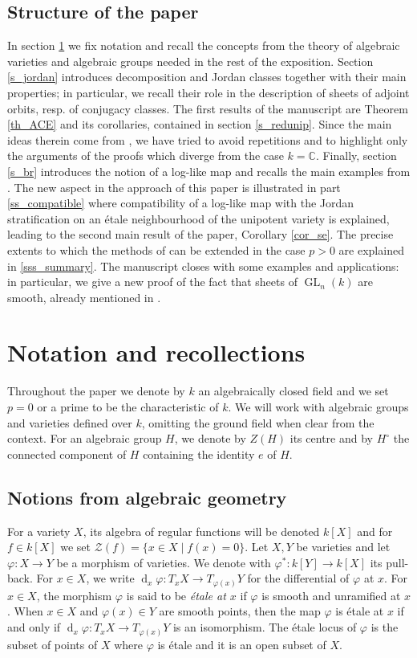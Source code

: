 \documentclass[12pt]{amsart}
\theoremstyle{definition}
\theoremstyle{remark}
\newcommand{\C}{\mathbb{C}}
\newcommand{\diff}{\operatorname{d}}
\newcommand{\GL}{\operatorname{GL}}
\begin{document}
\subsection{Structure of the paper}
In section \ref{s_notation} we fix notation and recall the concepts from the theory of algebraic varieties and algebraic groups needed in the rest of the exposition.
Section \ref{s_jordan} introduces decomposition and Jordan classes together with their main properties; in particular, we recall their role in the description of sheets of adjoint orbits, resp. of conjugacy classes.
The first results of the manuscript are Theorem \ref{th_ACE} and its corollaries, contained in section \ref{s_redunip}.
Since the main ideas therein come from \cite{ACE}, we have tried to avoid repetitions and to highlight only the arguments of the proofs which diverge from the case $k = \C$.
Finally, section \ref{s_br} introduces the notion of a log-like map and recalls the main examples from \cite{BR, McN_NOgood}.
The new aspect in the approach of this paper is illustrated  in part \ref{ss_compatible} where compatibility of a log-like map with the Jordan stratification on an \'etale neighbourhood of the unipotent variety is explained, leading to the second main result of the paper, Corollary \ref{cor_se}.
The precise extents to which the methods of \cite{ACE} can be extended in the case $p > 0$ are explained in \ref{sss_summary}.
The manuscript closes with some examples and applications: in particular, we give a new proof of the fact that sheets of $\GL_n(k)$ are smooth, already mentioned in \cite{LusztigICC}. 

\section{Notation and recollections} \label{s_notation}
Throughout the paper we denote by $k$ an algebraically closed field and we set $p = 0$ or a prime to be the characteristic of $k$.
We will work with algebraic groups and varieties defined over $k$, omitting the ground field when clear from the context.
For an algebraic group $H$, we denote by $Z(H)$ its centre and by $H^\circ$ the connected component of $H$ containing the identity $e$ of $H$.

\subsection{Notions from algebraic geometry}
For a variety $X$, its algebra of regular functions will be denoted $k[X]$ and for $f \in k[X]$ we set $\mathcal{Z}(f) = \{ x \in X \mid f(x) = 0 \}$.
Let $X,Y$ be varieties and let $\varphi \colon X \to Y$ be a morphism of varieties.
We denote with $\varphi^* \colon k[Y] \to k[X]$ its pull-back.
For $x \in X$, we write $\diff_x \varphi \colon T_x X \to T_{\varphi(x)} Y$ for the differential of $\varphi$ at $x$.
For $x \in X$, the morphism $\varphi$ is said to be \emph{\'etale at $x$}  if $\varphi$ is smooth and unramified at $x$.
When $x \in X$ and $\varphi(x) \in Y$ are smooth points, then the map $\varphi$ is \'etale at $x$ if and only if $\diff_x \varphi \colon T_x X \to T_{\varphi(x)} Y$ is an isomorphism.
The \'etale locus of $\varphi$ is the subset of points of $X$ where $\varphi$ is \'etale and it is an open subset of $X$.
\end{document}
